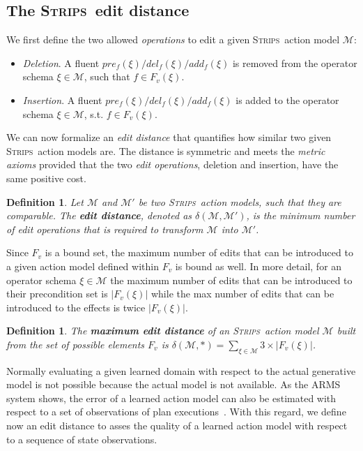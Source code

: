 \documentclass[3p,times]{elsarticle}
\newtheorem{mydefinition}[mytheorem]{Definition}
\newcommand{\strips}{\textsc{Strips}}     %
\begin{document}
\subsection{The \strips\ edit distance}

We first define the two allowed \emph{operations} to edit a given \strips\ action model $\mathcal{M}$:
\begin{itemize}
\item {\em Deletion}. A fluent $pre_f(\xi)/del_f(\xi)/add_f(\xi)$ is removed from the operator schema $\xi\in\mathcal{M}$, such that $f\in F_v(\xi)$.
\item {\em Insertion}. A fluent $pre_f(\xi)/del_f(\xi)/add_f(\xi)$ is added to the operator schema $\xi\in\mathcal{M}$, s.t. $f\in F_v(\xi)$.
\end{itemize}

We can now formalize an {\em edit distance} that quantifies how similar two given \strips\ action models are. The distance is symmetric and meets the {\em metric axioms} provided that the two {\em edit operations}, deletion and insertion, have the same positive cost.

\begin{mydefinition}
  Let $\mathcal{M}$ and $\mathcal{M}'$ be two \strips\ action models, such that they are {\em comparable}. The {\bf edit distance}, denoted as $\delta(\mathcal{M},\mathcal{M}')$, is the minimum number of {\em edit operations} that is required to transform $\mathcal{M}$ into $\mathcal{M}'$.
\end{mydefinition}

Since $F_v$ is a bound set, the maximum number of edits that can be introduced to a given action model defined within $F_v$ is bound as well. In more detail, for an operator schema $\xi\in\mathcal{M}$ the maximum number of edits that can be introduced to their precondition set is $|F_v(\xi)|$ while the max number of edits that can be introduced to the effects is twice $|F_v(\xi)|$. 
\begin{mydefinition}
The \textbf{maximum edit distance} of an \strips\ action model $\mathcal{M}$ built from the set of possible elements $F_v$ is $\delta(\mathcal{M},*)=\sum_{\xi\in\mathcal{M}} 3\times|F_v(\xi)|$.
\end{mydefinition}

Normally evaluating a given learned domain with respect to the actual generative model is not possible because the actual model is not available. As the ARMS system shows, the error of a learned action model can also be estimated with respect to a set of observations of plan executions~\cite{yang2007learning}. With this regard, we define now an edit distance to asses the quality of a learned action model with respect to a sequence of state observations.
\end{document}
